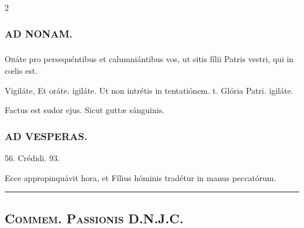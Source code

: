 \documentclass[9pt,twoside]{extarticle}
\begin{document}
\begin{multicols}{2}
\subsubsection*{\center \textsc{AD NONAM.}}
\subsubsection*{}
\lettrine{O}ráte pro persequéntibus et calumniántibus vos, ut sitis fílii Patris vestri, qui in cœlis est.

\begin{tightlist}{}
\item {} Vigiláte, \textred{*} Et oráte. igiláte.  Ut non intrétis in tentatiónem. t. Glória Patri. igiláte.
\item {} Factus est sudor ejus.  Sicut guttæ sánguinis.
\end{tightlist}

\subsubsection*{\center \textsc{AD VESPERAS.}}
\begin{tightlist}{}
\item {} 56.  Crédidi. 93.
\item {}
\item {} Ecce appropinquávit hora, et Fílius hóminis tradétur in manus peccatórum.
\item {}
\end{tightlist}

\begin{center}\textcolor{red}{\rule{\linewidth}{0.5pt}} \end{center}
\subsection*{\center {}}
\subsection*{\center \textsc{Commem. Passionis D.N.J.C.}}
\subsubsection*{\center {}}


\end{multicols}
\end{document}
